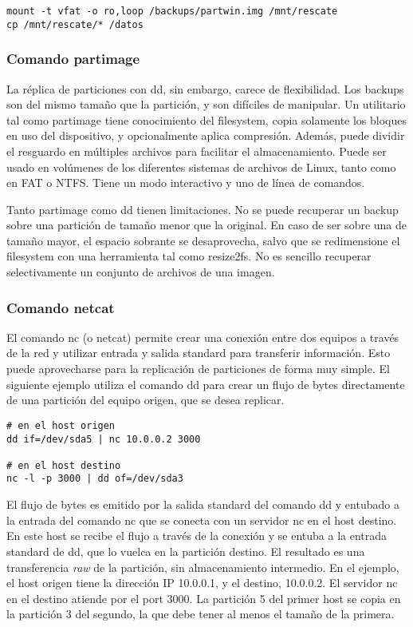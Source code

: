 \begin{lstlisting}
mount -t vfat -o ro,loop /backups/partwin.img /mnt/rescate
cp /mnt/rescate/* /datos
\end{lstlisting}


\subsubsection{Comando partimage}

La réplica de particiones con dd, sin embargo, carece de flexibilidad. Los backups son del mismo tamaño que la partición, y son difíciles de manipular. Un utilitario tal como partimage tiene conocimiento del filesystem, copia solamente los bloques en uso del dispositivo, y opcionalmente aplica compresión. Además, puede dividir el resguardo en múltiples archivos para facilitar el almacenamiento. Puede ser usado en volúmenes de los diferentes sistemas de archivos de Linux, tanto como en FAT o NTFS. Tiene un modo interactivo y uno de línea de comandos.

Tanto partimage como dd tienen limitaciones. No se puede recuperar un backup sobre una partición de tamaño menor que la original. En caso de ser sobre una de tamaño mayor, el espacio sobrante se desaprovecha, salvo que se redimensione el filesystem con una herramienta tal como resize2fs. No es sencillo recuperar selectivamente un conjunto de archivos de una imagen.

\subsubsection{Comando netcat}

El comando nc (o netcat) permite crear una conexión entre dos equipos a través de la red y utilizar entrada y salida standard para transferir información. Esto puede aprovecharse para la replicación de particiones de forma muy simple. El siguiente ejemplo utiliza el comando dd para crear un flujo de bytes directamente de una partición del equipo origen, que se desea replicar. 

\begin{lstlisting}
# en el host origen
dd if=/dev/sda5 | nc 10.0.0.2 3000

# en el host destino
nc -l -p 3000 | dd of=/dev/sda3
\end{lstlisting}

El flujo de bytes es emitido por la salida standard del comando dd y entubado a la entrada del comando nc que se conecta con un servidor nc en el host destino. En este host se recibe el flujo a través de la conexión y se entuba a la entrada standard de dd, que lo vuelca en la partición destino. El resultado es una transferencia \emph{raw} de la partición, sin almacenamiento intermedio. En el ejemplo, el host origen tiene la dirección IP 10.0.0.1, y el destino, 10.0.0.2. El servidor nc en el destino atiende por el port 3000. La partición 5 del primer host se copia en la partición 3 del segundo, la que debe tener al menos el tamaño de la primera.

